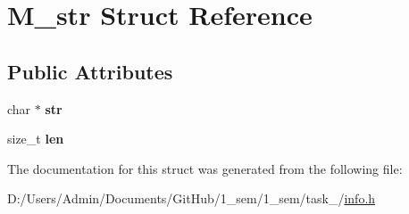 \hypertarget{struct_m__str}{}\section{M\+\_\+str Struct Reference}
\label{struct_m__str}
\subsection*{Public Attributes}
\begin{DoxyCompactItemize}
\item 
\mbox{\label{struct_m__str_adcd841cab7987809343cc71330b1d3ed}} 
char $\ast$ {\bfseries str}
\item 
\mbox{\label{struct_m__str_a6a6491c194723a85fd9fd5ffabd103a2}} 
size\+\_\+t {\bfseries len}
\end{DoxyCompactItemize}


The documentation for this struct was generated from the following file\+:\begin{DoxyCompactItemize}
\item 
D\+:/\+Users/\+Admin/\+Documents/\+Git\+Hub/1\+\_\+sem/1\+\_\+sem/task\+\_/\mbox{\hyperlink{info_8h}{info.\+h}}\end{DoxyCompactItemize}
